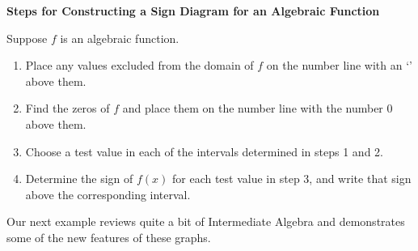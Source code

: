 \colorbox{ResultColor}{\bbm

\smallskip

\centerline{\textbf{Steps for Constructing a Sign Diagram for an Algebraic Function}} 

\smallskip

\hspace{.17in} Suppose $f$ is an algebraic function.

\begin{enumerate}

\item  Place any values excluded from the domain of  $f$ on the number line with an `\textinterrobang' above them.

\item  Find the zeros of $f$ and place them on the number line with the number $0$ above them.

\item  Choose a test value in each of the intervals determined in steps 1 and 2.

\item  Determine the sign of $f(x)$ for each test value in step 3, and write that sign above the corresponding interval.

\end{enumerate}

\ebm}

\medskip 

Our next example reviews quite a bit of Intermediate Algebra and demonstrates some of the new features of these graphs.

